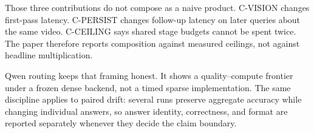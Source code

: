 Those three contributions do not compose as a naive product. C-VISION changes
first-pass latency. C-PERSIST changes follow-up latency on later queries about
the same video. C-CEILING says shared stage budgets cannot be spent twice. The
paper therefore reports composition against measured ceilings, not against
headline multiplication.

Qwen routing keeps that framing honest. It shows a quality--compute frontier
under a frozen dense backend, not a timed sparse implementation. The same
discipline applies to paired drift: several runs preserve aggregate accuracy
while changing individual answers, so answer identity, correctness, and format
are reported separately whenever they decide the claim boundary.
